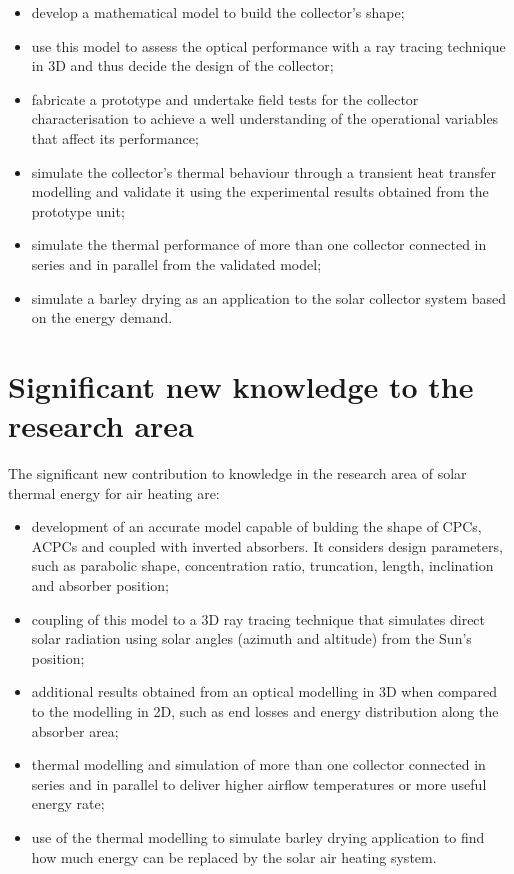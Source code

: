 \begin{itemize}
	\item develop a mathematical model to build the collector's shape;
	\item use this model to assess the optical performance with a ray tracing technique in 3D and thus decide the design of the collector;
	\item fabricate a prototype and undertake field tests for the collector characterisation to achieve a well understanding of the operational variables that affect its performance;
	\item simulate the collector's thermal behaviour through a transient heat transfer modelling and validate it using the experimental results obtained from the prototype unit;
	\item simulate the thermal performance of more than one collector connected in series and in parallel from the validated model;
	\item simulate a barley drying as an application to the solar collector system based on the energy demand.

\end{itemize}

\section{Significant new knowledge to the research area}

The significant new contribution to knowledge in the research area of solar thermal energy for air heating are:

\begin{itemize}
	\item development of an accurate model capable of bulding the shape of CPCs, ACPCs and coupled with inverted absorbers. It considers design parameters, such as parabolic shape, concentration ratio, truncation, length, inclination and absorber position;
	\item coupling of this model to a 3D ray tracing technique that simulates direct solar radiation using solar angles (azimuth and altitude) from the Sun's position;
	\item additional results obtained from an optical modelling in 3D when compared to the modelling in 2D, such as end losses and energy distribution along the absorber area;
	\item thermal modelling and simulation of more than one collector connected in series and in parallel to deliver higher airflow temperatures or more useful energy rate;
	\item use of the thermal modelling to simulate barley drying application to find how much energy can be replaced by the solar air heating system.
\end{itemize}

